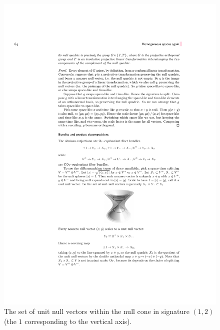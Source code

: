 \begin{figure}[tp]
    \centering
    \includegraphics[scale=0.8]{figures/null cone.pdf}
    \caption{The set of unit null vectors within the null cone in signature $(1,2)$ (the $1$ corresponding to the vertical axis). \label{fig null cone}}
\end{figure}

